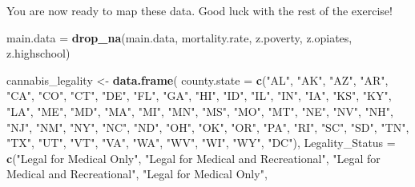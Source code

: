 \documentclass[
]{article}
\newenvironment{Shaded}{\begin{snugshade}}{\end{snugshade}}
\newcommand{\AttributeTok}[1]{\textcolor[rgb]{0.13,0.29,0.53}{#1}}
\newcommand{\FunctionTok}[1]{\textcolor[rgb]{0.13,0.29,0.53}{\textbf{#1}}}
\newcommand{\NormalTok}[1]{#1}
\newcommand{\OtherTok}[1]{\textcolor[rgb]{0.56,0.35,0.01}{#1}}
\newcommand{\StringTok}[1]{\textcolor[rgb]{0.31,0.60,0.02}{#1}}
\begin{document}
\vspace{6mm}

You are now ready to map these data. Good luck with the rest of the
exercise!

\begin{Shaded}
\begin{Highlighting}[]
\NormalTok{main.data }\OtherTok{=} \FunctionTok{drop\_na}\NormalTok{(main.data, mortality.rate, z.poverty, z.opiates, z.highschool)}

\NormalTok{cannabis\_legality }\OtherTok{\textless{}{-}} \FunctionTok{data.frame}\NormalTok{(}
  \AttributeTok{county.state =} \FunctionTok{c}\NormalTok{(}\StringTok{"AL"}\NormalTok{, }\StringTok{"AK"}\NormalTok{, }\StringTok{"AZ"}\NormalTok{, }\StringTok{"AR"}\NormalTok{, }\StringTok{"CA"}\NormalTok{, }
            \StringTok{"CO"}\NormalTok{, }\StringTok{"CT"}\NormalTok{, }\StringTok{"DE"}\NormalTok{, }\StringTok{"FL"}\NormalTok{, }\StringTok{"GA"}\NormalTok{, }
            \StringTok{"HI"}\NormalTok{, }\StringTok{"ID"}\NormalTok{, }\StringTok{"IL"}\NormalTok{, }\StringTok{"IN"}\NormalTok{, }\StringTok{"IA"}\NormalTok{, }
            \StringTok{"KS"}\NormalTok{, }\StringTok{"KY"}\NormalTok{, }\StringTok{"LA"}\NormalTok{, }\StringTok{"ME"}\NormalTok{, }\StringTok{"MD"}\NormalTok{, }
            \StringTok{"MA"}\NormalTok{, }\StringTok{"MI"}\NormalTok{, }\StringTok{"MN"}\NormalTok{, }\StringTok{"MS"}\NormalTok{, }
            \StringTok{"MO"}\NormalTok{, }\StringTok{"MT"}\NormalTok{, }\StringTok{"NE"}\NormalTok{, }\StringTok{"NV"}\NormalTok{, }\StringTok{"NH"}\NormalTok{, }
            \StringTok{"NJ"}\NormalTok{, }\StringTok{"NM"}\NormalTok{, }\StringTok{"NY"}\NormalTok{, }\StringTok{"NC"}\NormalTok{, }
            \StringTok{"ND"}\NormalTok{, }\StringTok{"OH"}\NormalTok{, }\StringTok{"OK"}\NormalTok{, }\StringTok{"OR"}\NormalTok{, }\StringTok{"PA"}\NormalTok{, }
            \StringTok{"RI"}\NormalTok{, }\StringTok{"SC"}\NormalTok{, }\StringTok{"SD"}\NormalTok{, }\StringTok{"TN"}\NormalTok{, }
            \StringTok{"TX"}\NormalTok{, }\StringTok{"UT"}\NormalTok{, }\StringTok{"VT"}\NormalTok{, }\StringTok{"VA"}\NormalTok{, }\StringTok{"WA"}\NormalTok{, }
            \StringTok{"WV"}\NormalTok{, }\StringTok{"WI"}\NormalTok{, }\StringTok{"WY"}\NormalTok{, }\StringTok{"DC"}\NormalTok{),}
  \AttributeTok{Legality\_Status =} \FunctionTok{c}\NormalTok{(}\StringTok{"Legal for Medical Only"}\NormalTok{, }\StringTok{"Legal for Medical and Recreational"}\NormalTok{, }
                      \StringTok{"Legal for Medical and Recreational"}\NormalTok{, }\StringTok{"Legal for Medical Only"}\NormalTok{, }

\end{Highlighting}
\end{Shaded}
\end{document}
